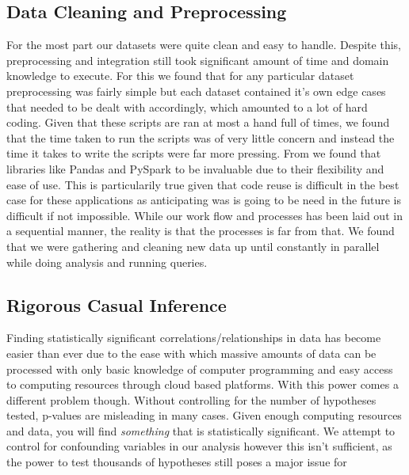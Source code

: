 \documentclass[a4paper]{article}
\begin{document}
	\subsection{Data Cleaning and Preprocessing}
		For the most part our datasets were quite clean and easy to handle. Despite this,
		preprocessing and integration still took significant amount of time and domain 
		knowledge to execute. For this we found that for any particular dataset preprocessing
		was fairly simple but each dataset contained it's own edge cases that needed to be dealt
		with accordingly, which amounted to a lot of hard coding. Given that these scripts 
		are ran at most a hand full of times, we found that the time taken to run the scripts 
		was of very little concern and instead the time it takes to write the scripts were 
		far more pressing. From we found that libraries like Pandas and PySpark to be invaluable
		due to their flexibility and ease of use. This is particularily true given that 
		code reuse is difficult in the best case for these applications as anticipating 
		was is going to be need in the future is difficult if not impossible. While our work
		flow and processes has been laid out in a sequential manner, the reality is that 
		the processes is far from that. We found that we were gathering and cleaning 
		new data up until constantly in parallel while doing analysis and running queries.



	\subsection{Rigorous Casual Inference}
		Finding statistically significant correlations/relationships in data
		has become easier than ever due to the ease with which massive amounts of 
		data can be processed with only basic knowledge of computer programming and 
		easy access to computing resources through cloud based platforms. With this 
		power comes a different problem though. Without controlling for the number of 
		hypotheses tested, p-values are misleading in many cases. Given enough computing 
		resources and data, you will find \emph{something} that is statistically significant.
		We attempt to control for confounding variables in our analysis however this isn't 
		sufficient, as the power to test thousands of hypotheses still poses a major issue 
		for %
		
\end{document}

